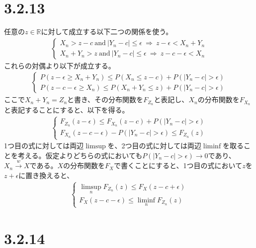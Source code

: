 \documentclass{article}
\begin{document}
\section{3.2.13}
任意の$z \in \mathbb{R}$に対して成立する以下二つの関係を使う。
\begin{align*}
	\begin{cases}
	X_n > z-c\ \text{and}\ |Y_n - c| \leq \epsilon\ \Rightarrow\ z-\epsilon < X_n + Y_n\\
	X_n + Y_n > z\ \text{and}\ |Y_n - c| \leq \epsilon\ \Rightarrow\ z-c-\epsilon < X_n
	\end{cases}
\end{align*}
これらの対偶より以下が成立する。
\begin{align*}
	\begin{cases}
	P\left( z-\epsilon \geq X_n + Y_n \right) \leq P\left( X_n \leq z-c \right) + P\left( |Y_n - c| > \epsilon \right)\\[8pt]
	P\left( z-c-\epsilon \geq X_n \right) \leq P\left( X_n + Y_n \leq z \right) + P\left( |Y_n - c| > \epsilon \right)
	\end{cases}
\end{align*}
ここで$X_n + Y_n = Z_n$と書き、その分布関数を$F_{Z_n}$と表記し、$X_n$の分布関数を$F_{X_n}$と表記することにすると、以下を得る。
\begin{align*}
	\begin{cases}
	F_{Z_n}\left( z-\epsilon \right) \leq F_{X_n}\left( z-c \right) + P\left( |Y_n - c| > \epsilon \right)\\[8pt]
	F_{X_n}(z-c-\epsilon) - P\left( |Y_n - c| > \epsilon \right) \leq F_{Z_n}(z)
	\end{cases}
\end{align*}
1つ目の式に対しては両辺$\limsup$を、2つ目の式に対しては両辺$\liminf$を取ることを考える。仮定よりどちらの式においても$P\left( |Y_n - c| > \epsilon \right) \to 0$であり、$X_n \xrightarrow{w} X$である。$X$の分布関数を$F_X$で書くことにすると、1つ目の式において$z$を$z+\epsilon$に置き換えると、
\begin{align*}
	\begin{cases}
	\limsup_n F_{Z_n}(z) \leq F_X(z-c+\epsilon)\\
	F_X(z-c-\epsilon) \leq \liminf_n F_{Z_n}(z)
	\end{cases}
\end{align*}

\section{3.2.14}
\end{document}
